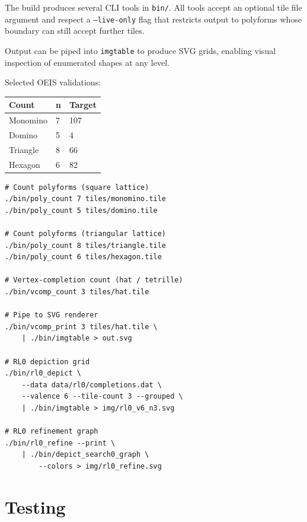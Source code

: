 \documentclass[10pt,a4paper]{article}
\let\polysection\section
\renewcommand\section{\needspace{0.16\textheight}\polysection}
\newcommand{\code}[1]{\texttt{\small #1}}
\newcommand{\file}[1]{\texttt{\footnotesize #1}}
\begin{document}
\begin{tcolorbox}[dualbox, title=Usage Examples]
  The build produces several CLI tools in \file{bin/}.  All tools
  accept an optional tile file argument and respect a \code{--live-only}
  flag that restricts output to polyforms whose boundary can still
  accept further tiles.

  Output can be piped into \code{imgtable} to produce SVG grids,
  enabling visual inspection of enumerated shapes at any level.

  Selected OEIS validations:
  \vspace{4pt}
  \begin{tabular}{@{}lll@{}}
  \toprule
  \textbf{Count} & \textbf{n} & \textbf{Target} \\
  \midrule
  Monomino & 7 & 107 \\
  Domino   & 5 & 4 \\
  Triangle & 8 & 66 \\
  Hexagon  & 6 & 82 \\
  \bottomrule
  \end{tabular}
\tcblower
\begin{verbatim}
# Count polyforms (square lattice)
./bin/poly_count 7 tiles/monomino.tile
./bin/poly_count 5 tiles/domino.tile

# Count polyforms (triangular lattice)
./bin/poly_count 8 tiles/triangle.tile
./bin/poly_count 6 tiles/hexagon.tile

# Vertex-completion count (hat / tetrille)
./bin/vcomp_count 3 tiles/hat.tile

# Pipe to SVG renderer
./bin/vcomp_print 3 tiles/hat.tile \
    | ./bin/imgtable > out.svg

# RL0 depiction grid
./bin/rl0_depict \
    --data data/rl0/completions.dat \
    --valence 6 --tile-count 3 --grouped \
    | ./bin/imgtable > img/rl0_v6_n3.svg

# RL0 refinement graph
./bin/rl0_refine --print \
    | ./bin/depict_search0_graph \
        --colors > img/rl0_refine.svg
\end{verbatim}
\end{tcolorbox}

\section{Testing}
\end{document}
